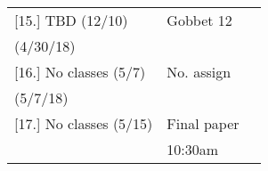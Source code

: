 \documentclass[article,oneside]{memoir}
\begin{document}
\begin{center}
\begin{longtable}{p{4.5cm}p{2cm}p{6cm}}
[15.] TBD (12/10)					& Gobbet 12			& \\ 
(4/30/18)				 		     	&			       	& \\ [1.8\baselineskip]

[16.] No classes (5/7)		    		& No. assign			& \\ 
(5/7/18)				    		  	& 			     	& \\ [1.8\baselineskip]

[17.] No classes (5/15)			    	& Final paper		& \\ 
				      				&  10:30am    		& \\

\end{longtable}
\end{center}



\end{document}
